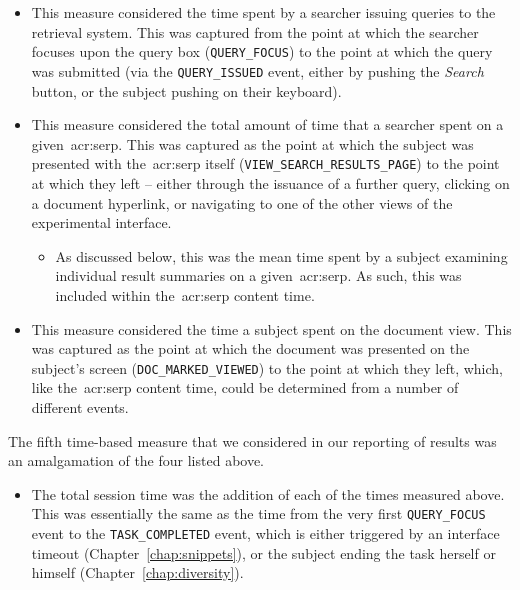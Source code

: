 \begin{itemize}
    \item{ This measure considered the time spent by a searcher issuing queries to the retrieval system. This was captured from the point at which the searcher focuses upon the query box (\texttt{QUERY\_FOCUS}) to the point at which the query was submitted (via the \texttt{QUERY\_ISSUED} event, either by pushing the \emph{Search} button, or the subject pushing \Return on their keyboard).}
    \item{ This measure considered the total amount of time that a searcher spent on a given~\gls{acr:serp}. This was captured as the point at which the subject was presented with the~\gls{acr:serp} itself (\texttt{VIEW\_SEARCH\_RESULTS\_PAGE}) to the point at which they left -- either through the issuance of a further query, clicking on a document hyperlink, or navigating to one of the other views of the experimental interface.}
    
    \begin{itemize}
        \item{ As discussed below, this was the mean time spent by a subject examining individual result summaries on a given~\gls{acr:serp}. As such, this was included within the~\gls{acr:serp} content time.}
    \end{itemize}
    
    \item{ This measure considered the time a subject spent on the document view. This was captured as the point at which the document was presented on the subject's screen (\texttt{DOC\_MARKED\_VIEWED}) to the point at which they left, which, like the~\gls{acr:serp} content time, could be determined from a number of different events.}
\end{itemize}

\vspace*{-3mm}
The fifth time-based measure that we considered in our reporting of results was an amalgamation of the four listed above.
\vspace*{-3mm}

\begin{itemize}
    \item{ The total session time was the addition of each of the times measured above. This was essentially the same as the time from the very first \texttt{QUERY\_FOCUS} event to the \texttt{TASK\_COMPLETED} event, which is either triggered by an interface timeout (Chapter~\ref{chap:snippets}), or the subject ending the task herself or himself (Chapter~\ref{chap:diversity}).}
    
\end{itemize}

